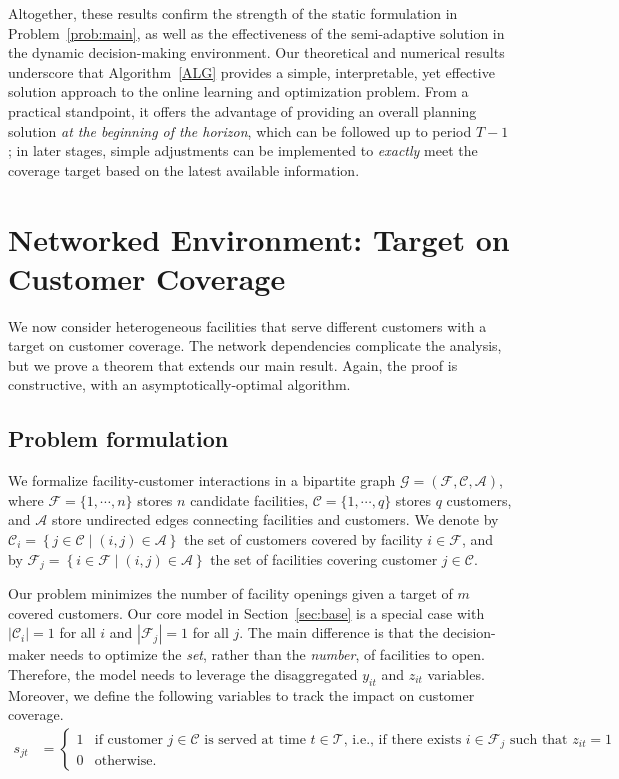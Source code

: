 \documentclass[nonblindrev]{informs3noheader}
\def\calA{\mathcal{A}}
\def\calC{\mathcal{C}}
\def\calF{\mathcal{F}}
\def\calG{\mathcal{G}}
\def\calT{\mathcal{T}}
\begin{document}
Altogether, these results confirm the strength of the static formulation in Problem~\eqref{prob:main}, as well as the effectiveness of the semi-adaptive solution in the dynamic decision-making environment. Our theoretical and numerical results underscore that Algorithm~\ref{ALG} provides a simple, interpretable, yet effective solution approach to the online learning and optimization problem. From a practical standpoint, it offers the advantage of providing an overall planning solution \textit{at the beginning of the horizon}, which can be followed up to period $T-1$; in later stages, simple adjustments can be implemented to \textit{exactly} meet the coverage target based on the latest available information.

\section{Networked Environment: Target on Customer Coverage}
\label{sec:network}

We now consider heterogeneous facilities that serve different customers with a target on customer coverage. The network dependencies complicate the analysis, but we prove a theorem that extends our main result. Again, the proof is constructive, with an asymptotically-optimal algorithm.

\subsection{Problem formulation}

We formalize facility-customer interactions in a bipartite graph $\calG=(\calF,\calC, \calA)$, where $\calF=\{1, \cdots, n\}$ stores $n$ candidate facilities, $\calC=\{1, \cdots, q\}$ stores $q$ customers, and $\calA$ store undirected edges connecting facilities and customers. We denote by $\calC_i=\left\{j\in\calC\mid(i,j)\in\calA\right\}$ the set of customers covered by facility $i\in\calF$, and by $\calF_j=\left\{i\in\calF\mid(i,j)\in\calA\right\}$ the set of facilities covering customer $j\in\calC$.

Our problem minimizes the number of facility openings given a target of $m$ covered customers. Our core model in Section~\ref{sec:base} is a special case with $|\calC_i|=1$ for all $i$ and $|\calF_j|=1$ for all $j$. The main difference is that the decision-maker needs to optimize the \emph{set}, rather than the \textit{number}, of facilities to open. Therefore, the model needs to leverage the disaggregated $y_{it}$ and $z_{it}$ variables. Moreover, we define the following variables to track the impact on customer coverage.
\begin{align*}
    s_{jt}&=\begin{cases}
        1&\text{if customer $j \in \calC$ is served at time $t\in\calT$, i.e., if there exists $i\in\calF_j$ such that $z_{it}=1$}\\
        0&\text{otherwise.}
    \end{cases}
\end{align*}
\end{document}
